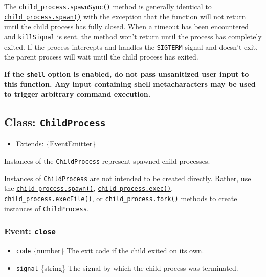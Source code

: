 The \texttt{child\_process.spawnSync()} method is generally identical to
\hyperref[child_processspawncommand-args-options]{\texttt{child\_process.spawn()}}
with the exception that the function will not return until the child
process has fully closed. When a timeout has been encountered and
\texttt{killSignal} is sent, the method won't return until the process
has completely exited. If the process intercepts and handles the
\texttt{SIGTERM} signal and doesn't exit, the parent process will wait
until the child process has exited.

\textbf{If the \texttt{shell} option is enabled, do not pass unsanitized
user input to this function. Any input containing shell metacharacters
may be used to trigger arbitrary command execution.}

\subsection{\texorpdfstring{Class:
\texttt{ChildProcess}}{Class: ChildProcess}}\label{class-childprocess}

\begin{itemize}
\tightlist
\item
  Extends: \{EventEmitter\}
\end{itemize}

Instances of the \texttt{ChildProcess} represent spawned child
processes.

Instances of \texttt{ChildProcess} are not intended to be created
directly. Rather, use the
\hyperref[child_processspawncommand-args-options]{\texttt{child\_process.spawn()}},
\hyperref[child_processexeccommand-options-callback]{\texttt{child\_process.exec()}},
\hyperref[child_processexecfilefile-args-options-callback]{\texttt{child\_process.execFile()}},
or
\hyperref[child_processforkmodulepath-args-options]{\texttt{child\_process.fork()}}
methods to create instances of \texttt{ChildProcess}.

\subsubsection{\texorpdfstring{Event:
\texttt{\textquotesingle{}close\textquotesingle{}}}{Event: \textquotesingle close\textquotesingle{}}}\label{event-close}

\begin{itemize}
\tightlist
\item
  \texttt{code} \{number\} The exit code if the child exited on its own.
\item
  \texttt{signal} \{string\} The signal by which the child process was
  terminated.
\end{itemize}

